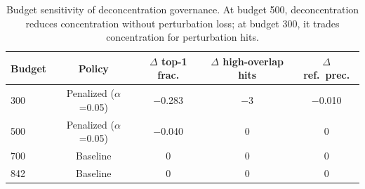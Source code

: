 \documentclass[11pt,a4paper]{article}
\begin{document}
\begin{table}[t]
  \centering
  \caption{Budget sensitivity of deconcentration governance.
  At budget 500, deconcentration reduces concentration without perturbation loss; at budget 300, it trades concentration for perturbation hits.}
  \label{tab:deconcentration}
  \small
  \begin{tabular}{@{}lcccc@{}}
    \toprule
    Budget & Policy & $\Delta$ top-1 frac. & $\Delta$ high-overlap hits & $\Delta$ ref.\ prec. \\
    \midrule
    300 & Penalized ($\alpha$=0.05) & $-$0.283 & $-$3 & $-$0.010 \\
    500 & Penalized ($\alpha$=0.05) & $-$0.040 &  0   &  0 \\
    700 & Baseline                  &  0       &  0   &  0 \\
    842 & Baseline                  &  0       &  0   &  0 \\
    \bottomrule
  \end{tabular}
\end{table}
\end{document}
